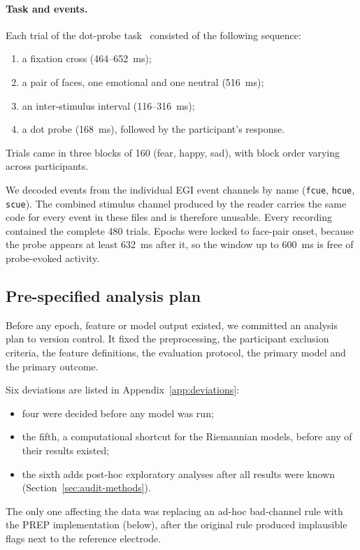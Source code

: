 \begin{table}[t]
\centering\small
\caption{Sample characteristics (all 53 recordings). Mean $\pm$ SD. $^\dagger$Descriptive only; never used as
predictors.}
\label{tab:demo}

\end{table}

\paragraph{Task and events.}
Each trial of the dot-probe task~\cite{macleod1986attentional} consisted of the following sequence:
\begin{enumerate}
  \item a fixation cross (464--652~ms);
  \item a pair of faces, one emotional and one neutral (516~ms);
  \item an inter-stimulus interval (116--316~ms);
  \item a dot probe (168~ms), followed by the participant's response.
\end{enumerate}
Trials came in three blocks of 160 (fear, happy, sad), with block order varying across participants.

We decoded events from the individual EGI event channels by name (\texttt{fcue}, \texttt{hcue}, \texttt{scue}). The
combined stimulus channel produced by the reader carries the same code for every event in these files and is
therefore unusable. Every recording contained the complete 480 trials. Epochs were locked to face-pair onset, because
the probe appears at least 632~ms after it, so the window up to 600~ms is free of probe-evoked activity.

\subsection{Pre-specified analysis plan}
Before any epoch, feature or model output existed, we committed an analysis plan to version control. It fixed the
preprocessing, the participant exclusion criteria, the feature definitions, the evaluation protocol, the primary model
and the primary outcome.

Six deviations are listed in Appendix~\ref{app:deviations}:
\begin{itemize}
  \item four were decided before any model was run;
  \item the fifth, a computational shortcut for the Riemannian models, before any of their results existed;
  \item the sixth adds post-hoc exploratory analyses after all results were known
        (Section~\ref{sec:audit-methods}).
\end{itemize}
The only one
affecting the data was replacing an ad-hoc bad-channel rule with the PREP implementation (below), after the original
rule produced implausible flags next to the reference electrode.

